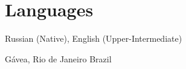 \documentclass[11pt,a4paper,sans]{moderncv}        %
\begin{document}
		
		\section{Languages}
		Russian (Native), English (Upper-Intermediate)
		
		\vspace*{\fill}
		\name{}{}
		\title{}
		\address{Av. Padre Leonel Franca, 261}{Gávea, Rio de Janeiro}{ Brazil }
		\makecvtitle
	
\end{document}
